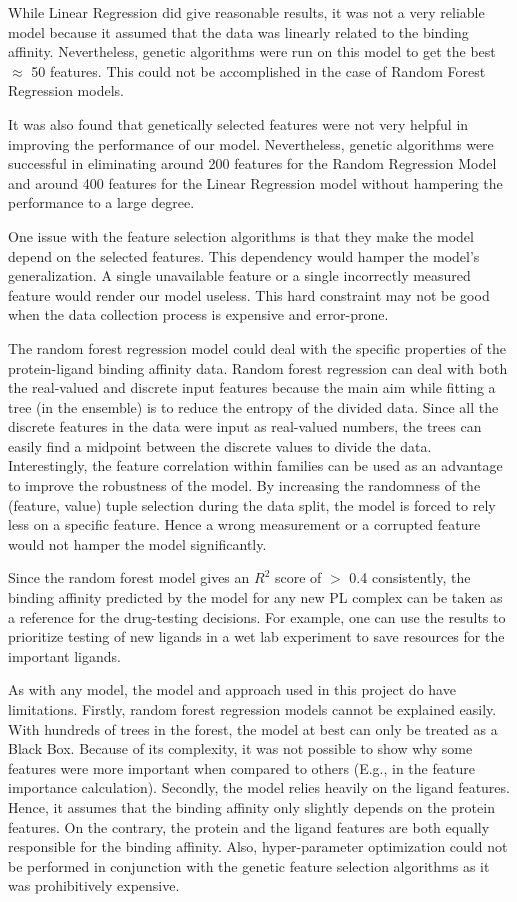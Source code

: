 \documentclass[11pt]{article}
\begin{document}
While Linear Regression did give reasonable results,  it was not a very reliable model because it assumed that the data was linearly related to the binding affinity.
Nevertheless,  genetic algorithms were run on this model to get the best $\approx$ 50 features.
This could not be accomplished in the case of Random Forest Regression models.

It was also found that genetically selected features were not very helpful in improving the performance of our model. Nevertheless, genetic algorithms were successful in eliminating around 200 features for the Random Regression Model and around 400 features for the Linear Regression model without hampering the performance to a large degree.

One issue with the feature selection algorithms is that they make the model depend on the selected features.
This dependency would hamper the model's generalization.
A single unavailable feature or a single incorrectly measured feature would render our model useless.
This hard constraint may not be good when the data collection process is expensive and error-prone.

The random forest regression model could deal with the specific properties of the protein-ligand binding affinity data.
Random forest regression can deal with both the real-valued and discrete input features because the main aim while fitting a tree (in the ensemble) is to reduce the entropy of the divided data.
Since all the discrete features in the data were input as real-valued numbers,  the trees can easily find a midpoint between the discrete values to divide the data. 
Interestingly, the feature correlation within families can be used as an advantage to improve the robustness of the model. 
By increasing the randomness of the (feature, value) tuple selection during the data split, the model is forced to rely less on a specific feature.
Hence a wrong measurement or a corrupted feature would not hamper the model significantly.

Since the random forest model gives an $R^2$ score of $>$ 0.4 consistently,  the binding affinity predicted by the model for any new PL complex can be taken as a reference for the drug-testing decisions.
For example,  one can use the results to prioritize testing of new ligands in a wet lab experiment to save resources for the important ligands.

As with any model,  the model and approach used in this project do have limitations. 
Firstly, random forest regression models cannot be explained easily.
With hundreds of trees in the forest, the model at best can only be treated as a Black Box.
Because of its complexity,  it was not possible to show why some features were more important when compared to others (E.g., in the feature importance calculation).
Secondly, the model relies heavily on the ligand features. 
Hence, it assumes that the binding affinity only slightly depends on the protein features. On the contrary, the protein and the ligand features are both equally responsible for the binding affinity.
Also,  hyper-parameter optimization could not be performed
in conjunction with the genetic feature selection algorithms as it was prohibitively expensive.
\end{document}
